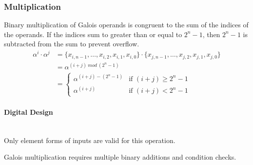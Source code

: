 \subsubsection{Multiplication} Binary multiplication of Galois operands is
congruent to the sum of the indices of the operands. If the indices sum to
greater than or equal to $2^{n}-1$, then $2^{n}-1$ is subtracted from the sum
to prevent overflow.
    \begin{align*}
        \alpha^{i} \cdot \alpha^{j} & = \{ x_{i, n-1}, \ldots, x_{i, 2}, x_{i,
        1}, x_{i, 0} \} \cdot \{x_{j, n-1}, \ldots, x_{j, 2}, x_{j, 1}, x_{j,
        0}\} \\
        & = \alpha^{(i + j) \ mod \ (2^{n}-1)} \\
        & = \begin{cases}
                \alpha^{(i + j) - (2^{n}-1)} & \text{if $(i + j) \geq 2^{n}-1$}
                \\
                \alpha^{(i + j)} & \text{if $(i + j) < 2^{n}-1$}
            \end{cases}
    \end{align*}

    \paragraph{{\small Digital Design}} \leavevmode \\ Only element forms of
    inputs are valid for this operation.

    Galois multiplication requires multiple binary additions and condition
    checks.